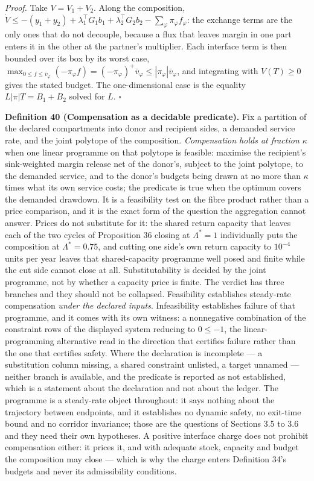 \documentclass[11pt]{article}
\begin{document}
\emph{Proof.} Take \(V = V_1 + V_2\). Along the composition, \(\dot V \le -(y_1 +\allowbreak{} y_2) +\allowbreak{} \lambda_1^{\top} G_1 b_1 +\allowbreak{} \lambda_2^{\top} G_2 b_2 - \sum_\varphi \pi_\varphi f_\varphi\): the exchange terms are the only ones that do not decouple, because a flux that leaves margin in one part enters it in the other at the partner's multiplier. Each interface term is then bounded over its box by its worst case, \(\max_{0 \le f \le \bar v_\varphi}(-\pi_\varphi f) =\allowbreak{} (-\pi_\varphi)^{+\allowbreak{}}\bar v_\varphi \le |\pi_\varphi|\bar v_\varphi\), and integrating with \(V(T) \ge 0\) gives the stated budget. The one-dimensional case is the equality \(L|\pi|T = B_1 + B_2\) solved for \(L\). \(\square\)

\textbf{Definition 40 (Compensation as a decidable predicate).} Fix a partition of the declared compartments into donor and recipient sides, a demanded service rate, and the joint polytope of the composition. \emph{Compensation holds at fraction \(\kappa\)} when one linear programme on that polytope is feasible: maximise the recipient's sink-weighted margin release net of the donor's, subject to the joint polytope, to the demanded service, and to the donor's budgets being drawn at no more than \(\kappa\) times what its own service costs; the predicate is true when the optimum covers the demanded drawdown. It is a feasibility test on the fibre product rather than a price comparison, and it is the exact form of the question the aggregation cannot answer. Prices do not substitute for it: the shared return capacity that leaves each of the two cycles of Proposition 36 closing at \(\Lambda^{*} = 1\) individually puts the composition at \(\Lambda^{*} = 0.75\), and cutting one side's own return capacity to \(10^{-4}\) units per year leaves that shared-capacity programme well posed and finite while the cut side cannot close at all. Substitutability is decided by the joint programme, not by whether a capacity price is finite. The verdict has three branches and they should not be collapsed. Feasibility establishes steady-rate compensation \emph{under the declared inputs}. Infeasibility establishes failure of that programme, and it comes with its own witness: a nonnegative combination of the constraint rows of the displayed system reducing to \(0 \le -1\), the linear-programming alternative read in the direction that certifies failure rather than the one that certifies safety. Where the declaration is incomplete --- a substitution column missing, a shared constraint unlisted, a target unnamed --- neither branch is available, and the predicate is reported as not established, which is a statement about the declaration and not about the ledger. The programme is a steady-rate object throughout: it says nothing about the trajectory between endpoints, and it establishes no dynamic safety, no exit-time bound and no corridor invariance; those are the questions of Sections 3.5 to 3.6 and they need their own hypotheses. A positive interface charge does not prohibit compensation either: it prices it, and with adequate stock, capacity and budget the composition may close --- which is why the charge enters Definition 34's budgets and never its admissibility conditions.
\end{document}
